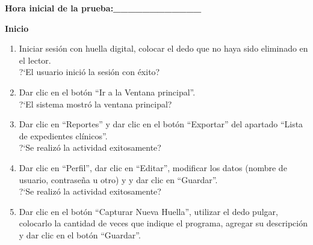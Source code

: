 \textbf{Hora inicial de la prueba:\_\_\_\_\_\_\_\_\_\_\_\_}

\textbf{Inicio}


\begin{enumerate}
	\item {Iniciar sesión con huella digital, colocar el dedo que no haya sido eliminado en el lector.\\	
	?`El usuario inició la sesión con éxito?
	}
	\item {Dar clic en el botón ``Ir a la Ventana principal''.\\	
	?`El sistema mostró la ventana principal?
	}
	\item {Dar clic en ``Reportes'' y dar clic en el botón ``Exportar'' del apartado ``Lista de expedientes clínicos''.\\	
	?`Se realizó la actividad exitosamente?
	}
	\item {Dar clic en ``Perfil'', dar clic en ``Editar'', modificar los datos (nombre de usuario, contraseña u otro) y y dar clic en ``Guardar''.\\	
	?`Se realizó la actividad exitosamente?
	}
	\item {Dar clic en el botón ``Capturar Nueva Huella'', utilizar el dedo pulgar, colocarlo la cantidad de veces que indique el programa, agregar su descripción y dar clic en el botón ``Guardar''.\\
}
\end{enumerate}

